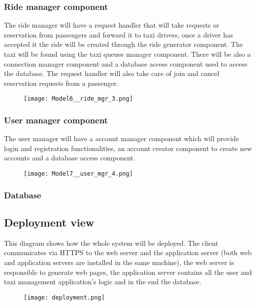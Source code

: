 	\subsubsection{Ride manager component}
		The ride manager will have a request handler that will take requests or reservation from passengers and forward it to taxi drivers, once a driver has accepted it the ride will be created through the ride generator component. The taxi will be found using the taxi queues manager component. There will be also a connection manager component and a database access component used to access the database.
		The request handler will also take care of join and cancel reservation requests from a passenger. 
		\begin{figure}[h!]
			\centering
			\texttt{[image: Model6\_\_ride\_mgr\_3.png]}
		\end{figure}
		\newpage

	\subsubsection{User manager component}
		The user manager will have a account manager component which will provide login and registration functionalities, an account creator component to create new accounts and a database access component.
		\begin{figure}[h!]
			\centering
			\texttt{[image: Model7\_\_user\_mgr\_4.png]}
		\end{figure}
		\newpage
	
	\subsubsection{Database}
	\begin{figure}[h!]
		\centering
	\end{figure}
	\newpage		

\subsection{Deployment view}
This diagram shows how the whole system will be deployed.
The client communicates via HTTPS to the web server and the application server (both web and application servers are installed in the same machine), the web server is responsible to generate web pages, the application server contains all the user and taxi management application's logic and in the end the database.
	\begin{figure}[h!]
		\centering
		\texttt{[image: deployment.png]}
	\end{figure}
	\newpage

